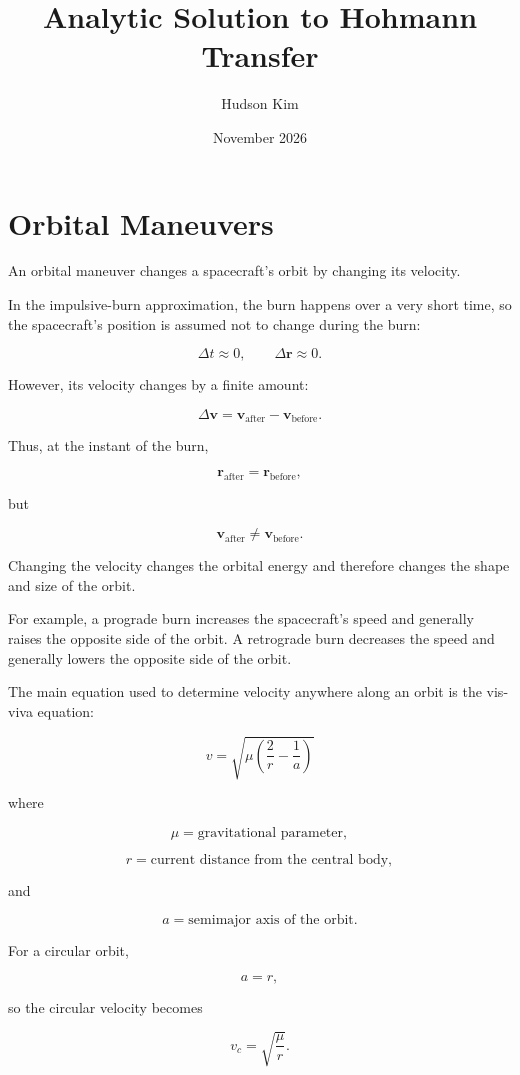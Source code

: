 \documentclass{article}
\title{Analytic Solution to Hohmann Transfer}
\author{Hudson Kim}
\date{November 2026}
\begin{document}
\maketitle

\section{Orbital Maneuvers}

An orbital maneuver changes a spacecraft's orbit by changing its velocity.

In the impulsive-burn approximation, the burn happens over a very short time, so the spacecraft's position is assumed not to change during the burn:

\[
\Delta t \approx 0,
\qquad
\Delta \mathbf r \approx 0.
\]

However, its velocity changes by a finite amount:

\[
\Delta \mathbf v
=
\mathbf v_{\text{after}}
-
\mathbf v_{\text{before}}.
\]

Thus, at the instant of the burn,

\[
\mathbf r_{\text{after}}
=
\mathbf r_{\text{before}},
\]

but

\[
\mathbf v_{\text{after}}
\neq
\mathbf v_{\text{before}}.
\]

Changing the velocity changes the orbital energy and therefore changes the shape and size of the orbit.

For example, a prograde burn increases the spacecraft's speed and generally raises the opposite side of the orbit. A retrograde burn decreases the speed and generally lowers the opposite side of the orbit.

The main equation used to determine velocity anywhere along an orbit is the vis-viva equation:

\[
\boxed{
v
=
\sqrt{
\mu
\left(
\frac{2}{r}
-
\frac{1}{a}
\right)
}
}
\]

where

\[
\mu = \text{gravitational parameter},
\]

\[
r = \text{current distance from the central body},
\]

and

\[
a = \text{semimajor axis of the orbit}.
\]

For a circular orbit,

\[
a=r,
\]

so the circular velocity becomes

\[
\boxed{
v_c
=
\sqrt{\frac{\mu}{r}}
}.
\]
\end{document}
